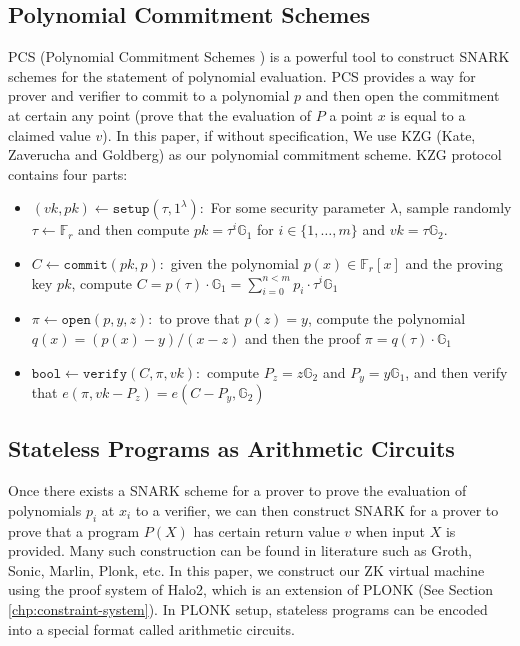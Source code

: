 \subsection{Polynomial Commitment Schemes}
PCS (Polynomial Commitment Schemes \cite{boneh2020halo-pcs,boneh2020efficient-pcs,kate2010polynomial-pcs}) is a powerful tool to construct SNARK schemes for the statement of polynomial evaluation. PCS provides a way for prover and verifier to commit to a polynomial $p$ and then open the commitment at certain any point (prove that the evaluation of $P$ a point $x$ is equal to a claimed value $v$). In this paper, if without specification, We use KZG (Kate, Zaverucha and Goldberg) as our polynomial commitment scheme. KZG protocol contains four parts: 
\begin{itemize}
\item $(vk,pk)\leftarrow\texttt{setup}(\tau, 1^\lambda):$ For some security parameter $\lambda$, sample randomly $\tau \leftarrow \mathbb{F}_r$ and then compute $pk=\tau^i\mathbb{G}_1$ for $i\in\{1,\dots,m\}$ and $vk=\tau \mathbb{G}_2$.
\item $C\leftarrow\texttt{commit}(pk,p):$ given the polynomial $p(x)\in \mathbb{F}_r[x]$ and the proving key $pk$, compute $C=p(\tau)\cdot\mathbb{G}_1=\sum_{i=0}^{n<m}p_i\cdot\tau^i\mathbb{G}_1$ 
\item $\pi\leftarrow\texttt{open}(p, y, z):$ to prove that $p(z)=y$, compute the polynomial $q(x)=(p(x)-y)/(x-z)$ and then the proof $\pi=q(\tau)\cdot\mathbb{G}_1$
\item $\texttt{bool}\leftarrow\texttt{verify}(C, \pi, vk):$ compute $P_z=z\mathbb{G}_2$ and $P_y=y\mathbb{G}_1$, and then verify that $e(\pi, vk-P_z)=e(C-P_y,\mathbb{G}_2)$
\end{itemize}
\subsection{Stateless Programs as Arithmetic Circuits}
\label{chp:arith-circuits}
Once there exists a SNARK scheme for a prover to prove the evaluation of polynomials $p_i$ at $x_i$ to a verifier, we can then construct SNARK for a prover to prove that a program $P(X)$ has certain return value $v$ when input $X$ is provided. Many such construction can be found in literature such as Groth, Sonic, Marlin, Plonk, etc. In this paper, we construct our ZK virtual machine using the proof system of Halo2, which is an extension of PLONK (See Section \ref{chp:constraint-system}). In PLONK setup, stateless programs can be encoded into a special format called arithmetic circuits.

